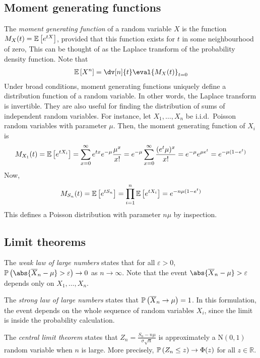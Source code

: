 \subsection{Moment generating functions}
The \textit{moment generating function} of a random variable $X$ is the function $M_X(t) = \mathbb{E}\left[{e^{tX}}\right]$, provided that this function exists for $t$ in some neighbourhood of zero,
This can be thought of as the Laplace transform of the probability density function.
Note that
\begin{align*}
	\expect{X^n} = \dv[n]{t} \eval{M_X(t)}_{t = 0}
\end{align*}
Under broad conditions, moment generating functions uniquely define a distribution function of a random variable.
In other words, the Laplace transform is invertible.
They are also useful for finding the distribution of sums of independent random variables.
For instance, let $X_1, \dots, X_n$ be i.i.d.\ Poisson random variables with parameter $\mu$.
Then, the moment generating function of $X_i$ is
\begin{align*}
	M_{X_1}(t) = \mathbb{E}\left[{e^{tX_i}}\right] = \sum_{x = 0}^\infty e^{tx} e^{-\mu} \frac{\mu^x}{x!} = e^{-\mu} \sum_{x=0}^\infty \frac{(e^t \mu)^x}{x!} = e^{-\mu} e^{\mu e^t} = e^{-\mu(1-e^t)}
\end{align*}
Now,
\begin{align*}
	M_{S_n}(t) = \mathbb{E}\left[{e^{tS_n}}\right] = \prod_{i=1}^n \mathbb{E}\left[{e^{tX_i}}\right] = e^{-n\mu(1-e^t)}
\end{align*}
This defines a Poisson distribution with parameter $n \mu$ by inspection.

\subsection{Limit theorems}
The \textit{weak law of large numbers} states that for all $\varepsilon > 0$, $\prob{\abs{\overline X_n - \mu} > \varepsilon} \to 0$ as $n \to \infty$.
Note that the event $\abs{\overline X_n - \mu} > \varepsilon$ depends only on $X_1, \dots, X_n$.

The \textit{strong law of large numbers} states that $\mathbb{P}\left({\overline X_n \to \mu}\right) = 1$.
In this formulation, the event depends on the whole sequence of random variables $X_i$, since the limit is inside the probability calculation.

The \textit{central limit theorem} states that $Z_n = \frac{S_n - n \mu}{\sigma\sqrt{n}}$ is approximately a $\mathrm{N}(0,1)$ random variable when $n$ is large.
More precisely, $\mathbb{P}\left({Z_n \leq z}\right) \to \Phi(z)$ for all $z \in \mathbb R$.

